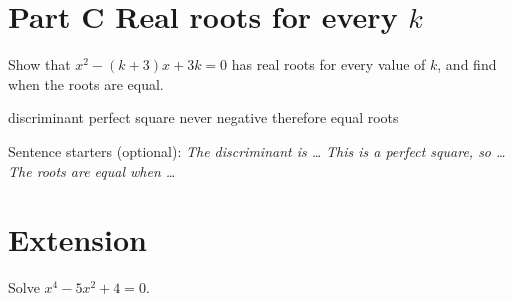 \documentclass[11pt]{article}
\begin{document}
\section*{Part C \textperiodcentered{} Real roots for every $k$}
Show that $x^{2} - (k + 3)x + 3k = 0$ has real roots for every value of $k$, and find when the roots are equal.
\begin{plainbox}[title={Words you may use}]
discriminant \textperiodcentered{} perfect square \textperiodcentered{} never negative \textperiodcentered{} therefore \textperiodcentered{} equal roots
\end{plainbox}
Sentence starters (optional): \emph{The discriminant is \ldots} \quad \emph{This is a perfect square, so \ldots} \quad \emph{The roots are equal when \ldots}

\section*{Extension}
Solve $x^{4} - 5x^{2} + 4 = 0$.
\al{}
\end{document}
